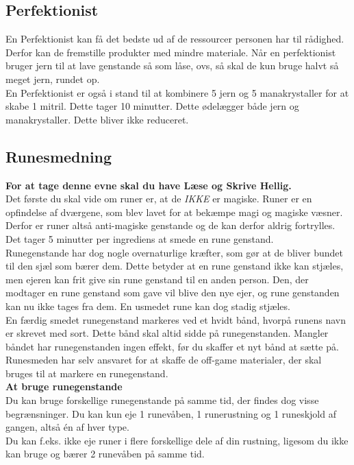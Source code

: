 \subsection{Perfektionist}
En Perfektionist kan få det bedste ud af de ressourcer personen har til rådighed. Derfor kan de fremstille produkter med mindre materiale. Når en perfektionist bruger jern til at lave genstande så som låse, ovs, så skal de kun bruge halvt så meget jern, rundet op.\\

En Perfektionist er også i stand til at kombinere 5 jern og 5 manakrystaller for at skabe 1 mitril. Dette tager 10 minutter. Dette ødelægger både jern og manakrystaller. Dette bliver ikke reduceret.\\


\subsection{Runesmedning}
\textbf{For at tage denne evne skal du have Læse og Skrive Hellig.}\\
Det første du skal vide om runer er, at de \emph{IKKE} er magiske. Runer er en opfindelse af dværgene, som blev lavet for at bekæmpe magi og magiske væsner. Derfor er runer altså anti-magiske genstande og de kan derfor aldrig fortrylles.\\
Det tager 5 minutter per ingrediens at smede en rune genstand.\\
Runegenstande har dog nogle overnaturlige kræfter, som gør at de bliver bundet til den sjæl som bærer dem. Dette betyder at en rune genstand ikke kan stjæles, men ejeren kan frit give sin rune genstand til en anden person. Den, der modtager en rune genstand som gave vil blive den nye ejer, og rune genstanden kan nu ikke tages fra dem. En usmedet rune kan dog stadig stjæles.\\

En færdig smedet runegenstand markeres ved et hvidt bånd, hvorpå runens navn er skrevet med sort. Dette bånd skal altid sidde på runegenstanden. Mangler båndet har runegenstanden ingen effekt, før du skaffer et nyt bånd at sætte på. Runesmeden har selv ansvaret for at skaffe de off-game materialer, der skal bruges til at markere en runegenstand.\\

\textbf{At bruge runegenstande}\\
Du kan bruge forskellige runegenstande på samme tid, der findes dog visse begrænsninger. Du kan
kun eje 1 runevåben, 1 runerustning og 1 runeskjold af gangen, altså én af hver type.\\
Du kan f.eks. ikke eje runer i flere forskellige dele af din rustning, ligesom du ikke kan bruge og bærer 2 runevåben på samme tid.\\

